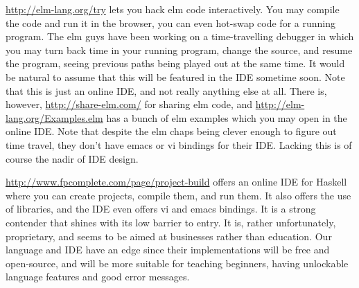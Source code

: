 \url{http://elm-lang.org/try} lets you hack elm code interactively. You may 
compile the code and run it in the browser, you can even hot-swap code for a 
running program. The elm guys have been working on a time-travelling debugger 
in which you may turn back time in your running program, change the source, 
and resume the program, seeing previous paths being played out at the same 
time. It would be natural to assume that this will be featured in the IDE 
sometime soon. Note that this is just an online IDE, and not really anything 
else at all. There is, however, \url{http://share-elm.com/} for sharing elm 
code, and \url{http://elm-lang.org/Examples.elm} has a bunch of elm examples 
which you may open in the online IDE. Note that despite the elm chaps being 
clever enough to figure out time travel, they don't have emacs or vi bindings 
for their IDE. Lacking this is of course the nadir of IDE design.

\url{http://www.fpcomplete.com/page/project-build} offers an online IDE for
Haskell where you can create projects, compile them, and run them. It also
offers the use of libraries, and the IDE even offers vi and emacs bindings.  It
is a strong contender that shines with its low barrier to entry. It is, rather
unfortunately, proprietary, and seems to be aimed at businesses rather than
education. Our language and IDE have an edge since their implementations will
be free and open-source, and will be more suitable for teaching beginners,
having unlockable language features and good error messages.
